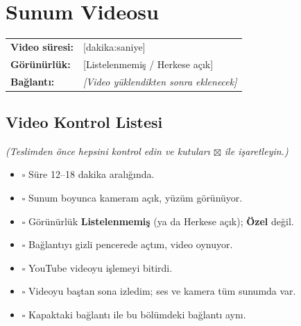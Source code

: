 \documentclass[12pt,a4paper]{article}
\newcommand{\aciklama}[1]{{\color{gray}\itshape (#1)}}
\newcommand{\youtubelink}{\textit{[Video yüklendikten sonra eklenecek]}}
\begin{document}
\section{Sunum Videosu}

\begin{center}
\begin{tabular}{@{}ll@{}}
\textbf{Video süresi:} & [dakika:saniye] \quad \aciklama{12--18 dakika olmalıdır} \\
\textbf{Görünürlük:} & [Listelenmemiş / Herkese açık] \\
\textbf{Bağlantı:} & \youtubelink \\
\end{tabular}
\end{center}

\subsection{Video Kontrol Listesi}
\aciklama{Teslimden önce hepsini kontrol edin ve kutuları $\boxtimes$ ile işaretleyin.}
\begin{itemize}
  \item $\square$ Süre 12--18 dakika aralığında.
  \item $\square$ Sunum boyunca kameram açık, yüzüm görünüyor.
  \item $\square$ Görünürlük \textbf{Listelenmemiş} (ya da Herkese açık); \textbf{Özel} değil.
  \item $\square$ Bağlantıyı gizli pencerede açtım, video oynuyor.
  \item $\square$ YouTube videoyu işlemeyi bitirdi.
  \item $\square$ Videoyu baştan sona izledim; ses ve kamera tüm sunumda var.
  \item $\square$ Kapaktaki bağlantı ile bu bölümdeki bağlantı aynı.
\end{itemize}

\end{document}
